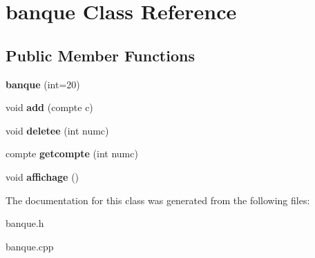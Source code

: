 \hypertarget{classbanque}{}\section{banque Class Reference}
\label{classbanque}
\subsection*{Public Member Functions}
\begin{DoxyCompactItemize}
\item 
\mbox{\label{classbanque_a90bab97b90c709c4e0e7defbe155d832}} 
{\bfseries banque} (int=20)
\item 
\mbox{\label{classbanque_ae1f082a369a6c50989bf2592199fff84}} 
void {\bfseries add} (compte c)
\item 
\mbox{\label{classbanque_a78b925541d7c009c40e3cf9d0385bbfa}} 
void {\bfseries deletee} (int numc)
\item 
\mbox{\label{classbanque_adc3ebc88f447a80b48d463199248ef63}} 
compte {\bfseries getcompte} (int numc)
\item 
\mbox{\label{classbanque_a77b5644ec1c62546079216b4514ff035}} 
void {\bfseries affichage} ()
\end{DoxyCompactItemize}


The documentation for this class was generated from the following files\+:\begin{DoxyCompactItemize}
\item 
banque.\+h\item 
banque.\+cpp\end{DoxyCompactItemize}
